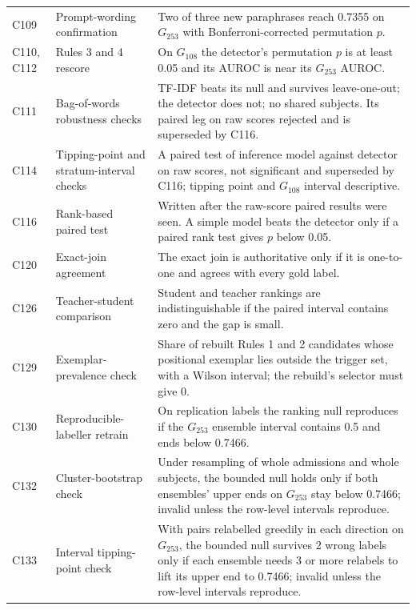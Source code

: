 \begin{longtable}{@{}>{\tblragged}p{0.75in}>{\tblragged}p{1.6in}>{\tblragged}p{3.3in}@{}}
\addlinespace[3pt]
C109 & Prompt-wording confirmation & Two of three new paraphrases reach 0.7355 on $G_{253}$ with Bonferroni-corrected permutation $p$. \\
\addlinespace[3pt]
C110, C112 & Rules 3 and 4 rescore & On $G_{108}$ the detector's permutation $p$ is at least 0.05 and its AUROC is near its $G_{253}$ AUROC. \\
\addlinespace[3pt]
C111 & Bag-of-words robustness checks & TF-IDF beats its null and survives leave-one-out; the detector does not; no shared subjects. Its paired leg on raw scores rejected and is superseded by C116. \\
\addlinespace[3pt]
C114 & Tipping-point and stratum-interval checks & A paired test of inference model against detector on raw scores, not significant and superseded by C116; tipping point and $G_{108}$ interval descriptive. \\
\addlinespace[3pt]
C116 & Rank-based paired test & Written after the raw-score paired results were seen. A simple model beats the detector only if a paired rank test gives $p$ below 0.05. \\
\addlinespace[3pt]
C120 & Exact-join agreement & The exact join is authoritative only if it is one-to-one and agrees with every gold label. \\
\addlinespace[3pt]
C126 & Teacher-student comparison & Student and teacher rankings are indistinguishable if the paired interval contains zero and the gap is small. \\
\addlinespace[3pt]
C129 & Exemplar-prevalence check & Share of rebuilt Rules 1 and 2 candidates whose positional exemplar lies outside the trigger set, with a Wilson interval; the rebuild's selector must give 0. \\
\addlinespace[3pt]
C130 & Reproducible-labeller retrain & On replication labels the ranking null reproduces if the $G_{253}$ ensemble interval contains 0.5 and ends below 0.7466. \\
\addlinespace[3pt]
C132 & Cluster-bootstrap check & Under resampling of whole admissions and whole subjects, the bounded null holds only if both ensembles' upper ends on $G_{253}$ stay below 0.7466; invalid unless the row-level intervals reproduce. \\
\addlinespace[3pt]
C133 & Interval tipping-point check & With pairs relabelled greedily in each direction on $G_{253}$, the bounded null survives 2 wrong labels only if each ensemble needs 3 or more relabels to lift its upper end to 0.7466; invalid unless the row-level intervals reproduce. \\

\end{longtable}
